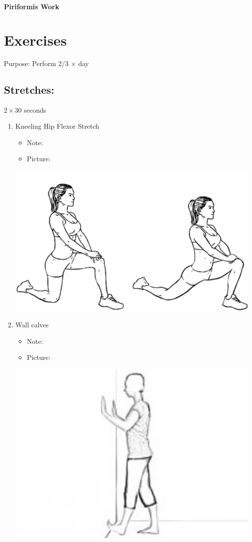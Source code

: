 \documentclass{article}
\begin{document}
\begin{center}
    {\bf\Huge Piriformis Work}
\end{center}

\section*{Exercises}

Purpose: Perform 2/3 $\times$ day 

\subsection*{Stretches:} $2 \times 30 $ seconds

\begin{enumerate}

\item Kneeling Hip Flexor Stretch 

    \begin{itemize}

        \item Note: 

        \item Picture:

    \end{itemize}

     \includegraphics[width=.50\textwidth]{hip_flexor.png}

\item Wall calves 

    \begin{itemize}

        \item Note: 

        \item Picture:

    \end{itemize}

     \includegraphics[width=.40\textwidth]{wall_calves.png}


\end{enumerate}
\end{document}
